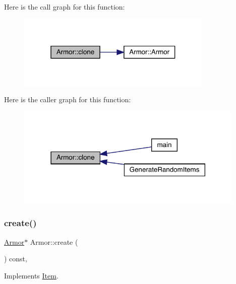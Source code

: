 Here is the call graph for this function\+:
\nopagebreak
\begin{figure}[H]
\begin{center}
\leavevmode
\includegraphics[width=265pt]{d9/d76/class_armor_aac8aec108de9a8a45bada1534c0f23b7_cgraph}
\end{center}
\end{figure}
Here is the caller graph for this function\+:
\nopagebreak
\begin{figure}[H]
\begin{center}
\leavevmode
\includegraphics[width=309pt]{d9/d76/class_armor_aac8aec108de9a8a45bada1534c0f23b7_icgraph}
\end{center}
\end{figure}
\mbox{\label{class_armor_a21de0acaa6ecdb6f5937166b83da9b01}} 
\subsubsection{\texorpdfstring{create()}{create()}}
{\footnotesize\ttfamily \mbox{\hyperlink{class_armor}{Armor}}$\ast$ Armor\+::create (\begin{DoxyParamCaption}{ }\end{DoxyParamCaption}) const\hspace{0.3cm}{\ttfamily [inline]}, {\ttfamily [virtual]}}



Implements \mbox{\hyperlink{class_item_a17b3fa0cef44ada961e0d3c65e1de864}{Item}}.

